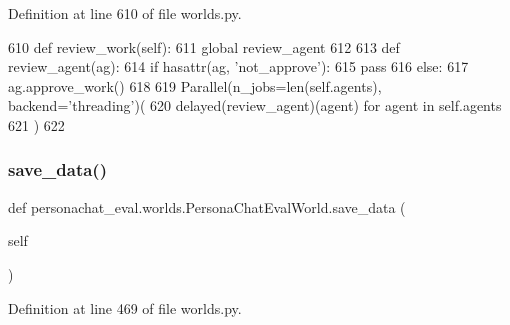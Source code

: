 Definition at line 610 of file worlds.\+py.


\begin{DoxyCode}
610     \textcolor{keyword}{def }review\_work(self):
611         \textcolor{keyword}{global} review\_agent
612 
613         \textcolor{keyword}{def }review\_agent(ag):
614             \textcolor{keywordflow}{if} hasattr(ag, \textcolor{stringliteral}{'not\_approve'}):
615                 \textcolor{keywordflow}{pass}
616             \textcolor{keywordflow}{else}:
617                 ag.approve\_work()
618 
619         Parallel(n\_jobs=len(self.agents), backend=\textcolor{stringliteral}{'threading'})(
620             delayed(review\_agent)(agent) \textcolor{keywordflow}{for} agent \textcolor{keywordflow}{in} self.agents
621         )
622 \end{DoxyCode}
\mbox{\label{classpersonachat__eval_1_1worlds_1_1PersonaChatEvalWorld_a1e6d0c1ef81b0a0b4602d243560dece2}} 
\subsubsection{\texorpdfstring{save\+\_\+data()}{save\_data()}}
{\footnotesize\ttfamily def personachat\+\_\+eval.\+worlds.\+Persona\+Chat\+Eval\+World.\+save\+\_\+data (\begin{DoxyParamCaption}\item[{}]{self }\end{DoxyParamCaption})}



Definition at line 469 of file worlds.\+py.


